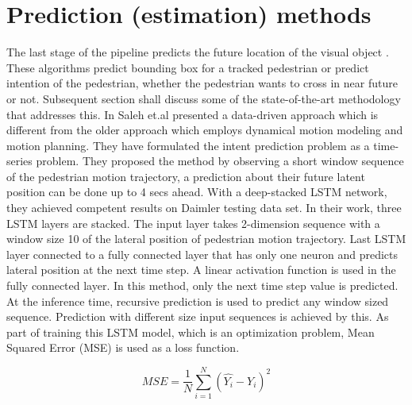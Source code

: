\section{Prediction (estimation) methods }
The last stage of the pipeline predicts the future location of the visual object \cite{saleh2017intent, zhang2019sr, xue2018ss, lipton2015critical}. These algorithms predict bounding box for a tracked pedestrian or predict intention of the pedestrian, whether the pedestrian wants to cross in near future or not. Subsequent section shall discuss some of the state-of-the-art methodology that addresses this.
In \cite{saleh2017intent} Saleh et.al presented a data-driven approach which is different from the older approach which employs dynamical motion modeling and motion planning. They have formulated the intent prediction problem as a time-series problem. They proposed the method by observing a short window sequence of the pedestrian motion trajectory, a prediction about their future latent position can be done up to 4 secs ahead. With a deep-stacked LSTM network, they achieved competent results on Daimler testing data set. In their work, three LSTM layers are stacked. The input layer takes 2-dimension sequence with a window size 10 of the lateral position of pedestrian motion trajectory. Last LSTM layer connected to a fully connected layer that has only one neuron and predicts lateral position at the next time step. A linear activation function is used in the fully connected layer. In this method, only the next time step value is predicted. At the inference time, recursive prediction is used to predict any window sized sequence. Prediction with different size input sequences is achieved by this.
As part of training this LSTM  model, which is an optimization problem, Mean Squared Error (MSE) is used as a loss function.

\begin{equation}
MSE= \frac{1}{N}\sum_{i=1}^{N}(\hat{Y_i} - Y_i)^2
\end{equation}

